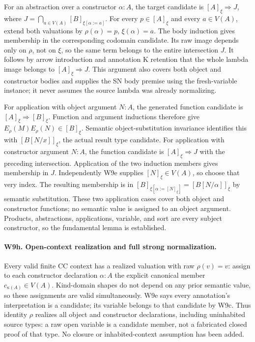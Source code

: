 For an abstraction over a constructor \(\alpha:A\), the target
candidate is \([A]_\xi\Rightarrow J\), where
\(J=\bigcap_{a\in V(A)}[B]_{\xi[\alpha:=a]}\).
For every \(p\in[A]_\xi\) and every \(a\in V(A)\), extend both
valuations by \(\rho(\alpha)=p\), \(\xi(\alpha)=a\).
The body induction gives membership in the corresponding codomain
candidate. Its raw image depends only on \(\rho\), not on \(\xi\),
so the same term belongs to the entire intersection \(J\). It follows
by arrow introduction and annotation K retention that the whole lambda
image belongs to \([A]_\xi\Rightarrow J\). This argument also
covers both object and constructor bodies and supplies the SN body
premise using the fresh-variable instance; it never assumes the source
lambda was already normalizing.

For application with object argument \(N:A\), the generated function
candidate is \([A]_\xi\Rightarrow[B]_\xi\). Function and argument
inductions therefore give \(E_\rho(M)E_\rho(N)\in[B]_\xi\).
Semantic object-substitution invariance identifies this with
\([B[N/x]]_\xi\), the actual result type candidate.
For application with constructor argument \(N:A\), the function
candidate is \([A]_\xi\Rightarrow J\) with the preceding
intersection. Application of the two induction members gives membership
in \(J\). Independently W9e supplies \([N]_\xi\in V(A)\), so choose
that very index. The resulting membership is in
\([B]_{\xi[\alpha:=[N]_\xi]}=[B[N/\alpha]]_\xi\) by semantic
substitution. These two application cases cover both object and
constructor functions; no semantic value is assigned to an object
argument. Products, abstractions, applications, variable, and sort are
every subject constructor, so the fundamental lemma is established.

\paragraph{W9h. Open-context realization and full strong normalization.}
Every valid finite CC context has a realized valuation with raw
\(\rho(v)=v\): assign to each constructor declaration
\(\alpha:A\) the explicit canonical member
\(c_{\kappa(A)}\in V(A)\). Kind-domain shapes do not depend on any
prior semantic value, so these assignments are valid simultaneously.
W9e says every annotation's interpretation is a candidate; its variable
belongs to that candidate by W9c. Thus identity \(\rho\) realizes
all object and constructor declarations, including uninhabited source
types: a raw open variable is a candidate member, not a fabricated
closed proof of that type. No closure or inhabited-context assumption
has been added.

